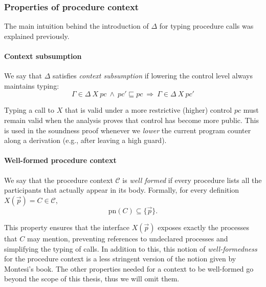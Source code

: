 \documentclass[12pt,a4paper,twoside]{book}
\newcommand{\pn}{\mathrm{pn}}
\begin{document}
\subsubsection{Properties of procedure context}
The main intuition behind the introduction of $\Delta$ for typing procedure calls was explained previously.

\paragraph{Context subsumption}
We say that \(\Delta\) satisfies \emph{context subsumption} if lowering the control level always maintains typing:
\begin{equation}\label{ass:ctx_sub}
  \Gamma \in \Delta~X~pc\ \wedge\ pc' \sqsubseteq pc
  \ \Longrightarrow\
  \Gamma \in \Delta~X~pc'
\end{equation}

Typing a call to \(X\) that is valid under a more restrictive (higher) control
  \(pc\) must remain valid when the analysis proves that control has become more public.
  This is used in the soundness proof whenever we \emph{lower} the current program counter along a derivation (e.g., after leaving a high guard).

\paragraph{Well-formed procedure context}
We say that the procedure context \(\mathscr{C}\) is \emph{well formed} if every procedure lists all the participants that actually appear in its body. Formally, for every definition \(X(\vec{p}) = C \in \mathscr{C}\),
\begin{equation} \label{ass:wellf_ctx}
  \pn(C) \subseteq \{\vec{p}\}.
\end{equation}

This property ensures that the interface \(X(\vec{p})\) exposes exactly the processes that \(C\) may mention, preventing references to undeclared processes and simplifying the typing of calls. In addition to this, this notion of \emph{well-formedness} for the procedure context is a less stringent version of the notion given by Montesi's book\cite{montesi2023introduction}.
The other properties needed for a context to be well-formed go beyond the scope of this thesis, thus we will omit them.
\end{document}
